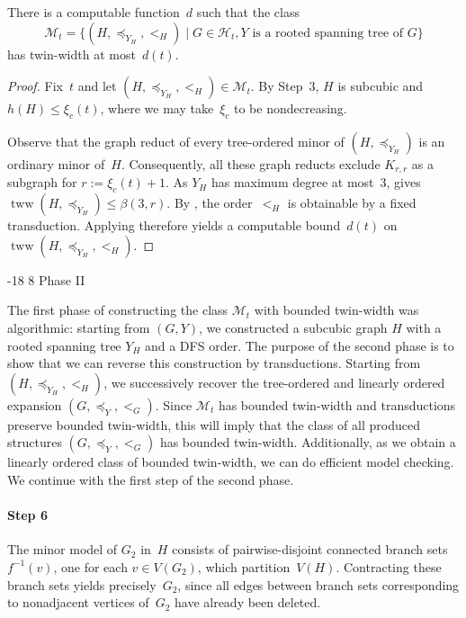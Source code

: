 \documentclass[1p,number,11pt]{elsarticle}
\makeatletter
\renewcommand\subsection{\@startsection{subsection}{2}{\z@}%
  {-18\p@ \@plus -4\p@ \@minus -4\p@}%
  {8\p@ \@plus 4\p@ \@minus 4\p@}%
  {\normalfont\normalsize\bfseries}}
\theoremstyle{plain}
\newcommand{\Mm}{\mathscr{M}}
\renewcommand{\leq}{\leqslant}
\makeatother
\begin{document}
\begin{corollary}
    There is a computable function~$d$ such that the class
    \[\mathscr M_t = \{ (H,\preceq_{Y_H},<_H) \mid G\in \mathscr H_t, \text{$Y$~is a rooted spanning tree of $G$}\}\]
    has twin-width at most~$d(t)$.
\end{corollary}
\begin{proof}
Fix~$t$ and let $(H,\preceq_{Y_H},<_H)\in\mathscr M_t$.
By Step~3, $H$ is subcubic and $h(H)\leq\xi_c(t)$, where we may take~$\xi_c$ to be nondecreasing.

Observe that the graph reduct of every tree-ordered minor of $(H,\preceq_{Y_H})$ is an ordinary minor of~$H$.
Consequently, all these graph reducts exclude $K_{r,r}$ as a subgraph for $r:=\xi_c(t)+1$.
As $Y_H$ has maximum degree at most~$3$,  gives
$\operatorname{tww}(H,\preceq_{Y_H})\leq\beta(3,r)$.
By , the order~$<_H$ is obtainable by a fixed transduction.
Applying  therefore yields a computable bound~$d(t)$ on $\operatorname{tww}(H,\preceq_{Y_H},<_H)$.
\end{proof}

\subsection{Phase II}

The first phase of constructing the class $\Mm_t$ with bounded twin-width was algorithmic: starting from $(G,Y)$, we constructed a subcubic graph $H$ with a rooted spanning tree $Y_H$ and a DFS order. 
The purpose of the second phase is to show that we can reverse this construction by transductions. 
Starting from $(H,\preceq_{Y_H},<_H)$, we successively recover the tree-ordered and linearly ordered expansion $(G,\preceq_Y,<_G)$.
Since $\Mm_t$ has bounded twin-width and transductions preserve bounded twin-width, this will imply that the class of all produced structures $(G,\preceq_Y,<_G)$ has bounded twin-width. 
Additionally, as we obtain a linearly ordered class of bounded twin-width, we can do efficient model checking. 
We continue with the first step of the second phase.


\paragraph{Step 6}

The minor model of $G_2$ in~$H$ consists of pairwise-disjoint connected branch sets $f^{-1}(v)$, one for each $v\in V(G_2)$, which partition~$V(H)$.
Contracting these branch sets yields precisely~$G_2$, since all edges between branch sets corresponding to nonadjacent vertices of~$G_2$ have already been deleted.
\end{document}
